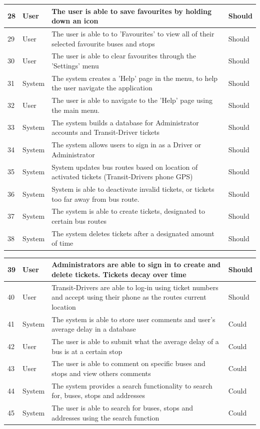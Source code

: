 \documentclass[a4paper,12pt]{article}
\begin{document}
\begin{tabular}{p{0.4cm}|p{2cm}|p{8cm}|p{1.7cm}}

28 & User & The user is able to save favourites by holding down an icon & Should \\
\hline
29 & User & The user is able to to 'Favourites' to view all of their selected favourite buses and stops & Should \\
\hline
30 & User & The user is able to clear favourites through the 'Settings' menu & Should \\
\hline
31 & System & The system creates a 'Help' page in the menu, to help the user navigate the application & Should \\
\hline
32 & User & The user is able to navigate to the 'Help' page using the main menu. & Should \\
\hline
33 & System & The system builds a database for Administrator accounts and Transit-Driver tickets & Should \\
\hline
34 & System & The system allows users to sign in as a Driver or Administrator & Should \\
\hline
35 & System & System updates bus routes based on location of activated tickets (Transit-Drivers phone GPS) & Should \\
\hline
36 & System & System is able to deactivate invalid tickets, or tickets too far away from bus route. & Should\\
\hline
37 & System & The system is able to create tickets, designated to certain bus routes & Should \\
\hline
38 & System & The system deletes tickets after a designated amount of time & Should \\
\hline

\end{tabular}

\pagebreak

\begin{tabular}{p{0.4cm}|p{2cm}|p{8cm}|p{1.7cm}}

39 & User & Administrators are able to sign in to create and delete tickets. Tickets decay over time & Should \\
\hline
40 & User & Transit-Drivers are able to log-in using ticket numbers and accept using their phone as the routes current location & Should \\
\hline
41 & System & The system is able to store user comments and user's average delay in a database & Could \\
\hline
42 & User & The user is able to submit what the average delay of a bus is at a certain stop & Could \\
\hline
43 & User & The user is able to comment on specific buses and stops and view others comments & Could \\
\hline
44 & System & The system provides a search functionality to search for, buses, stops and addresses & Could \\
\hline
45 & System & The user is able to search for buses, stops and addresses using the search function & Could \\
\hline
\end{tabular}
\end{document}
